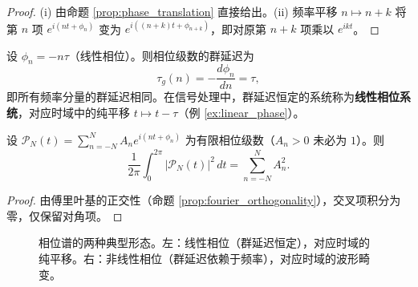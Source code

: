 \begin{proof}
(i) 由命题 \ref{prop:phase_translation} 直接给出。(ii) 频率平移 $n \mapsto n + k$ 将第 $n$ 项 $e^{i(nt+\phi_n)}$ 变为 $e^{i((n+k)t+\phi_{n+k})}$，即对原第 $n+k$ 项乘以 $e^{ikt}$。
\end{proof}

\begin{example}[线性相位与群延迟]\label{ex:linear_phase_group_delay}
设 $\phi_n = -n\tau$（线性相位）。则相位级数的群延迟为
\[
\tau_g(n) = -\frac{d\phi_n}{dn} = \tau,
\]
即所有频率分量的群延迟相同。在信号处理中，群延迟恒定的系统称为\textbf{线性相位系统}，对应时域中的纯平移 $t \mapsto t - \tau$（例 \ref{ex:linear_phase}）。
\end{example}

\begin{property}\label{prop:phase_parseval_finite}
设 $\mathcal{P}_N(t) = \sum_{n=-N}^{N} A_n e^{i(nt+\phi_n)}$ 为有限相位级数（$A_n > 0$ 未必为 $1$）。则
\[
\frac{1}{2\pi}\int_0^{2\pi} |\mathcal{P}_N(t)|^2\,dt = \sum_{n=-N}^{N} A_n^2.
\]
\end{property}

\begin{proof}
由傅里叶基的正交性（命题 \ref{prop:fourier_orthogonality}），交叉项积分为零，仅保留对角项。
\end{proof}

\begin{figure}[htbp]
\centering
{}
\caption{相位谱的两种典型形态。左：线性相位（群延迟恒定），对应时域的纯平移。右：非线性相位（群延迟依赖于频率），对应时域的波形畸变。}
\label{fig:phase_spectrum_examples}
\end{figure}

